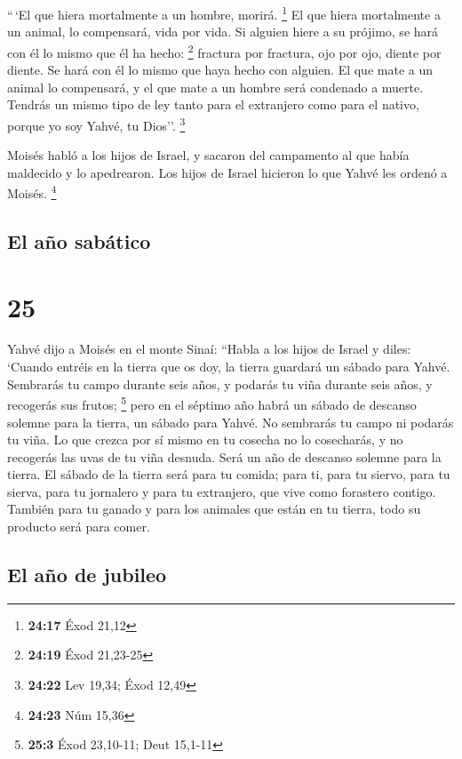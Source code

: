  ``\,`El que hiera mortalmente a un hombre, morirá.
\footnote{\textbf{24:17} Éxod 21,12}  El que hiera
mortalmente a un animal, lo compensará, vida por vida. 
Si alguien hiere a su prójimo, se hará con él lo mismo que él ha hecho:
\footnote{\textbf{24:19} Éxod 21,23-25}  fractura por
fractura, ojo por ojo, diente por diente. Se hará con él lo mismo que
haya hecho con alguien.  El que mate a un animal lo
compensará, y el que mate a un hombre será condenado a muerte.
 Tendrás un mismo tipo de ley tanto para el extranjero
como para el nativo, porque yo soy Yahvé, tu Dios''. \footnote{\textbf{24:22}
  Lev 19,34; Éxod 12,49}

 Moisés habló a los hijos de Israel, y sacaron del
campamento al que había maldecido y lo apedrearon. Los hijos de Israel
hicieron lo que Yahvé les ordenó a Moisés. \footnote{\textbf{24:23} Núm
  15,36}

\hypertarget{el-auxf1o-sabuxe1tico}{%
\subsection{El año sabático}\label{el-auxf1o-sabuxe1tico}}

\hypertarget{section-24}{%
\section{25}\label{section-24}}

 Yahvé dijo a Moisés en el monte Sinaí: 
``Habla a los hijos de Israel y diles: `Cuando entréis en la tierra que
os doy, la tierra guardará un sábado para Yahvé. 
Sembrarás tu campo durante seis años, y podarás tu viña durante seis
años, y recogerás sus frutos; \footnote{\textbf{25:3} Éxod 23,10-11;
  Deut 15,1-11}  pero en el séptimo año habrá un sábado de
descanso solemne para la tierra, un sábado para Yahvé. No sembrarás tu
campo ni podarás tu viña.  Lo que crezca por sí mismo en
tu cosecha no lo cosecharás, y no recogerás las uvas de tu viña desnuda.
Será un año de descanso solemne para la tierra.  El sábado
de la tierra será para tu comida; para ti, para tu siervo, para tu
sierva, para tu jornalero y para tu extranjero, que vive como forastero
contigo.  También para tu ganado y para los animales que
están en tu tierra, todo su producto será para comer.

\hypertarget{el-auxf1o-de-jubileo}{%
\subsection{El año de jubileo}\label{el-auxf1o-de-jubileo}}

